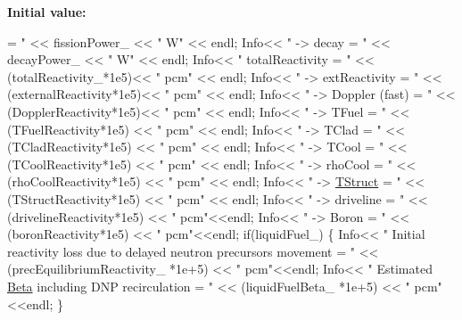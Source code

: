 {\bfseries Initial value\+:}
\begin{DoxyCode}
= \textcolor{stringliteral}{" << fissionPower\_ << "} W\textcolor{stringliteral}{" << endl;}
\textcolor{stringliteral}{Info<< "}    -> decay   = \textcolor{stringliteral}{" << decayPower\_ << "} W\textcolor{stringliteral}{" << endl;}
\textcolor{stringliteral}{Info<< "}    totalReactivity   = \textcolor{stringliteral}{" << (totalReactivity\_*1e5)<< "} pcm\textcolor{stringliteral}{" << endl;}
\textcolor{stringliteral}{Info<< "}    -> extReactivity  = \textcolor{stringliteral}{" << (externalReactivity*1e5)<< "} pcm\textcolor{stringliteral}{" << endl;}
\textcolor{stringliteral}{Info<< "}    -> Doppler (fast) = \textcolor{stringliteral}{" << (DopplerReactivity*1e5)<< "} pcm\textcolor{stringliteral}{" << endl;}
\textcolor{stringliteral}{Info<< "}    -> TFuel          = \textcolor{stringliteral}{" << (TFuelReactivity*1e5) << "} pcm\textcolor{stringliteral}{" << endl;}
\textcolor{stringliteral}{Info<< "}    -> TClad          = \textcolor{stringliteral}{" << (TCladReactivity*1e5) << "} pcm\textcolor{stringliteral}{" << endl;}
\textcolor{stringliteral}{Info<< "}    -> TCool          = \textcolor{stringliteral}{" << (TCoolReactivity*1e5) << "} pcm\textcolor{stringliteral}{" << endl;}
\textcolor{stringliteral}{Info<< "}    -> rhoCool        = \textcolor{stringliteral}{" << (rhoCoolReactivity*1e5) << "} pcm\textcolor{stringliteral}{" << endl;}
\textcolor{stringliteral}{Info<< "}    -> \hyperlink{createCouplingFields_8H_aff59c849e5a7c616f1bc0bb46332f5a3}{TStruct}        = \textcolor{stringliteral}{" << (TStructReactivity*1e5) << "} pcm\textcolor{stringliteral}{" << endl;}
\textcolor{stringliteral}{Info<< "}    -> driveline      = \textcolor{stringliteral}{" << (drivelineReactivity*1e5) << "} pcm\textcolor{stringliteral}{"<<endl;}
\textcolor{stringliteral}{Info<< "}    -> Boron      = \textcolor{stringliteral}{" << (boronReactivity*1e5) << "} pcm\textcolor{stringliteral}{"<<endl;}
\textcolor{stringliteral}{if(liquidFuel\_)}
\textcolor{stringliteral}{\{}
\textcolor{stringliteral}{    Info<< "}    Initial reactivity loss due to delayed neutron precursors movement = \textcolor{stringliteral}{"}
\textcolor{stringliteral}{    << (precEquilibriumReactivity\_ *1e+5) << "} pcm\textcolor{stringliteral}{"<<endl;}
\textcolor{stringliteral}{    Info<< "}    Estimated \hyperlink{setXSFields_8H_af87588a82c92b5a98302618c01213792}{Beta} including DNP recirculation = \textcolor{stringliteral}{"}
\textcolor{stringliteral}{    << (liquidFuelBeta\_ *1e+5) << "} pcm\textcolor{stringliteral}{"<<endl;}
\textcolor{stringliteral}{\}}

\end{DoxyCode}
